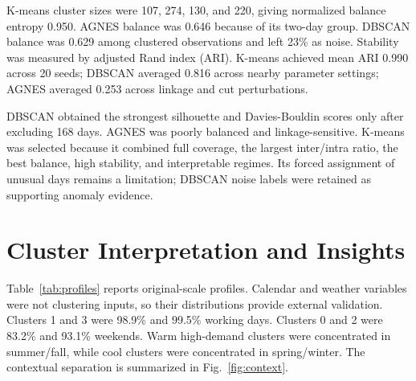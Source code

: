 \documentclass[conference]{IEEEtran}
\begin{document}
K-means cluster sizes were 107, 274, 130, and 220, giving normalized balance entropy 0.950. AGNES balance was 0.646 because of its two-day group. DBSCAN balance was 0.629 among clustered observations and left 23\% as noise. Stability was measured by adjusted Rand index (ARI). K-means achieved mean ARI 0.990 across 20 seeds; DBSCAN averaged 0.816 across nearby parameter settings; AGNES averaged 0.253 across linkage and cut perturbations.

DBSCAN obtained the strongest silhouette and Davies-Bouldin scores only after excluding 168 days. AGNES was poorly balanced and linkage-sensitive. K-means was selected because it combined full coverage, the largest inter/intra ratio, the best balance, high stability, and interpretable regimes. Its forced assignment of unusual days remains a limitation; DBSCAN noise labels were retained as supporting anomaly evidence.

\section{Cluster Interpretation and Insights}
Table~\ref{tab:profiles} reports original-scale profiles. Calendar and weather variables were not clustering inputs, so their distributions provide external validation. Clusters 1 and 3 were 98.9\% and 99.5\% working days. Clusters 0 and 2 were 83.2\% and 93.1\% weekends. Warm high-demand clusters were concentrated in summer/fall, while cool clusters were concentrated in spring/winter. The contextual separation is summarized in Fig.~\ref{fig:context}.

\begin{table}[t]
\caption{Original-Scale Profiles of Selected Clusters}
\label{tab:profiles}
\centering
\scriptsize
{}
\end{table}
\end{document}
